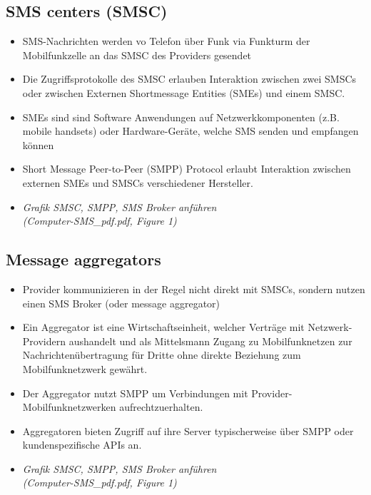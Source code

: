 \documentclass[german,12pt,a4paper]{article}
\begin{document}
\subsection{SMS centers (SMSC)}
\begin{itemize}
	\item SMS-Nachrichten werden vo Telefon über Funk via Funkturm der Mobilfunkzelle an das SMSC des Providers 
		gesendet
	\item Die Zugriffsprotokolle des SMSC erlauben Interaktion zwischen zwei SMSCs oder zwischen Externen Shortmessage 
		Entities (SMEs) und einem SMSC.
	\item SMEs sind sind Software Anwendungen auf Netzwerkkomponenten (z.B. mobile handsets) oder Hardware-Geräte, welche 
		SMS senden und empfangen können
	\item Short Message Peer-to-Peer (SMPP) Protocol erlaubt Interaktion zwischen externen SMEs und SMSCs 
		verschiedener Hersteller.
	\item \textit{Grafik SMSC, SMPP, SMS Broker anführen \\(Computer-SMS\_pdf.pdf, Figure 1)}
\end{itemize}

\subsection{Message aggregators}
\begin{itemize}
	\item Provider kommunizieren in der Regel nicht direkt mit SMSCs, sondern nutzen einen SMS Broker (oder message aggregator)
	\item Ein Aggregator ist eine Wirtschaftseinheit, welcher Verträge mit Netzwerk-Providern aushandelt und als Mittelsmann
		Zugang zu Mobilfunknetzen zur Nachrichtenübertragung für Dritte ohne direkte Beziehung zum Mobilfunknetzwerk gewährt. 
	\item Der Aggregator nutzt SMPP um Verbindungen mit Provider-Mobilfunknetzwerken aufrechtzuerhalten.
	\item Aggregatoren bieten Zugriff auf ihre Server typischerweise über SMPP oder kundenspezifische APIs an.
	\item \textit{Grafik SMSC, SMPP, SMS Broker anführen \\(Computer-SMS\_pdf.pdf, Figure 1)}
\end{itemize}
\end{document}

